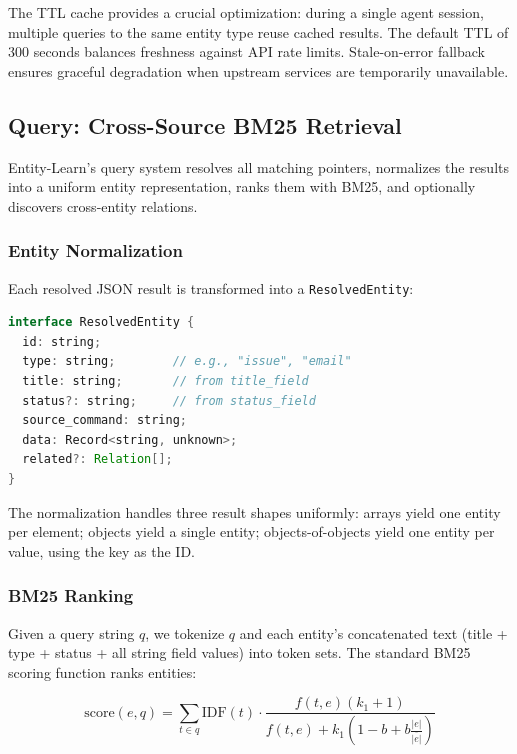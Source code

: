 \documentclass[11pt,twocolumn]{article}
\begin{document}
The TTL cache provides a crucial optimization: during a single agent session, multiple queries to the same entity type reuse cached results.
The default TTL of 300 seconds balances freshness against API rate limits.
Stale-on-error fallback ensures graceful degradation when upstream services are temporarily unavailable.


\subsection{Query: Cross-Source BM25 Retrieval}
\label{sec:query}

Entity-Learn's query system resolves all matching pointers, normalizes the results into a uniform entity representation, ranks them with BM25, and optionally discovers cross-entity relations.

\subsubsection{Entity Normalization}

Each resolved JSON result is transformed into a \texttt{ResolvedEntity}:

\begin{lstlisting}[language=Java,caption={ResolvedEntity structure}]
interface ResolvedEntity {
  id: string;
  type: string;        // e.g., "issue", "email"
  title: string;       // from title_field
  status?: string;     // from status_field
  source_command: string;
  data: Record<string, unknown>;
  related?: Relation[];
}
\end{lstlisting}

The normalization handles three result shapes uniformly: arrays yield one entity per element; objects yield a single entity; objects-of-objects yield one entity per value, using the key as the ID.

\subsubsection{BM25 Ranking}

Given a query string $q$, we tokenize $q$ and each entity's concatenated text (title + type + status + all string field values) into token sets.
The standard BM25 scoring function ranks entities:

\begin{equation}
\text{score}(e, q) = \sum_{t \in q} \text{IDF}(t) \cdot \frac{f(t, e) (k_1 {+} 1)}{f(t, e) + k_1 (1 {-} b {+} b \frac{|e|}{\overline{|e|}})}
\end{equation}
\end{document}
